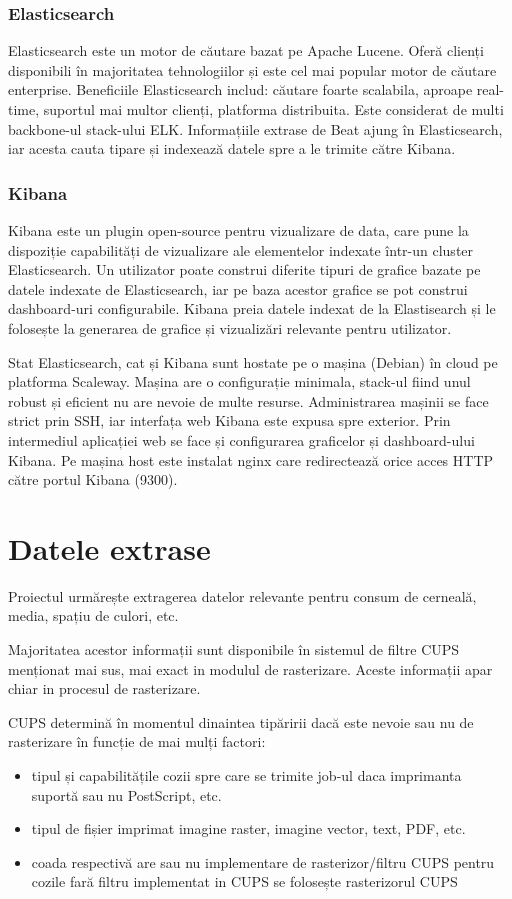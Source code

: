 \documentclass[a4paper, 12pt, twoside]{report}
\begin{document}
			\subsubsection{Elasticsearch}
Elasticsearch este un motor de căutare bazat pe Apache Lucene. Oferă clienți disponibili în majoritatea tehnologiilor și este cel mai popular motor de căutare enterprise. Beneficiile Elasticsearch includ: căutare foarte scalabila, aproape real-time, suportul mai multor clienți, platforma distribuita. Este considerat de multi backbone-ul stack-ului ELK. Informațiile extrase de Beat ajung în Elasticsearch, iar acesta cauta tipare și indexează datele spre a le trimite către Kibana.


			\subsubsection{Kibana}
Kibana este un plugin open-source pentru vizualizare de data, care pune la dispoziție capabilități de vizualizare ale elementelor indexate într-un cluster Elasticsearch. Un utilizator poate construi diferite tipuri de grafice bazate pe datele indexate de Elasticsearch, iar pe baza acestor grafice se pot construi dashboard-uri configurabile. Kibana preia datele indexat de la Elastisearch și le folosește la generarea de grafice și vizualizări relevante pentru utilizator.

Stat Elasticsearch, cat și Kibana sunt hostate pe o mașina (Debian) în cloud pe platforma Scaleway. Mașina are o configurație minimala, stack-ul fiind unul robust și eficient nu are nevoie de multe resurse. Administrarea mașinii se face strict prin SSH, iar interfața web Kibana este expusa spre exterior. Prin intermediul aplicației web se face și configurarea graficelor și dashboard-ului Kibana. Pe mașina host este instalat nginx care redirectează orice acces HTTP către portul Kibana (9300).

\section{Datele extrase}
Proiectul urmărește extragerea datelor relevante pentru consum de cerneală, media, spațiu de culori, etc.

Majoritatea acestor informații sunt disponibile în sistemul de filtre CUPS menționat mai sus, mai exact in modulul de rasterizare. Aceste informații apar chiar in procesul de rasterizare. 

\bigskip

CUPS determină în momentul dinaintea tipăririi dacă este nevoie sau nu de rasterizare în funcție de mai mulți factori:
\begin{itemize}
\item tipul și capabilitățile cozii spre care se trimite job-ul
	\subitem daca imprimanta suportă sau nu PostScript, etc.
\item tipul de fișier imprimat
	\subitem imagine raster, imagine vector, text, PDF, etc.
\item coada respectivă are sau nu implementare de rasterizor/filtru CUPS
	\subitem pentru cozile fară filtru implementat in CUPS se folosește rasterizorul CUPS
\end{itemize}
\end{document}
